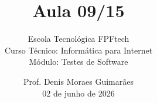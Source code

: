 
\title{Aula 09/15}

\subtitle{
\vspace{1.0cm}
Escola Tecnológica FPFtech\\
\vspace{0.5cm}
Curso Técnico: Informática para Internet\\
\vspace{0.5cm}
Módulo: Testes de Software
\vspace{1.0cm}
}

\author{
Prof. Denis Moraes Guimarães\\
\small 02 de junho de 2026
}

\date{}